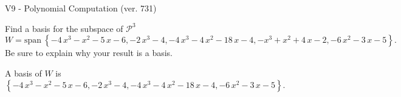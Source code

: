 \begin{exercise}
  \begin{exerciseTitle}V9 - Polynomial Computation (ver. 731)\end{exerciseTitle}
  \begin{exerciseStatement}
    Find a basis for the subspace of \(\mathcal{P}^3\) 
\[W=\mathrm{span}\ \left\{-4 \, x^{3} - x^{2} - 5 \, x - 6 , -2 \, x^{3} - 4 , -4 \, x^{3} - 4 \, x^{2} - 18 \, x - 4 , -x^{3} + x^{2} + 4 \, x - 2 , -6 \, x^{2} - 3 \, x - 5\right\}.\]
 Be sure to explain why your result is a basis.


  \end{exerciseStatement}
  \begin{exerciseAnswer}
   A basis of \(W\) is  \(\left\{-4 \, x^{3} - x^{2} - 5 \, x - 6 , -2 \, x^{3} - 4 , -4 \, x^{3} - 4 \, x^{2} - 18 \, x - 4 , -6 \, x^{2} - 3 \, x - 5\right\}\).
  


  \end{exerciseAnswer}
\end{exercise}